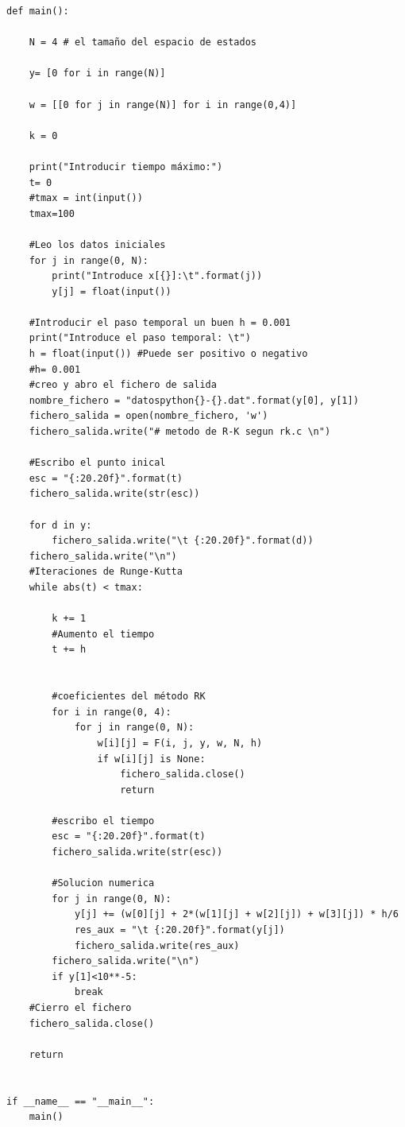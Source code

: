 \documentclass[pdftex,11pt,a4paper]{book}
\begin{document}
\begin{verbatim}
def main():

    N = 4 # el tamaño del espacio de estados

    y= [0 for i in range(N)]

    w = [[0 for j in range(N)] for i in range(0,4)]

    k = 0

    print("Introducir tiempo máximo:")
    t= 0
    #tmax = int(input())
    tmax=100

    #Leo los datos iniciales
    for j in range(0, N):
        print("Introduce x[{}]:\t".format(j))
        y[j] = float(input())

    #Introducir el paso temporal un buen h = 0.001
    print("Introduce el paso temporal: \t")
    h = float(input()) #Puede ser positivo o negativo
    #h= 0.001
    #creo y abro el fichero de salida
    nombre_fichero = "datospython{}-{}.dat".format(y[0], y[1])
    fichero_salida = open(nombre_fichero, 'w')
    fichero_salida.write("# metodo de R-K segun rk.c \n")

    #Escribo el punto inical
    esc = "{:20.20f}".format(t)
    fichero_salida.write(str(esc))

    for d in y:
        fichero_salida.write("\t {:20.20f}".format(d))
    fichero_salida.write("\n")
    #Iteraciones de Runge-Kutta
    while abs(t) < tmax:

        k += 1
        #Aumento el tiempo
        t += h


        #coeficientes del método RK
        for i in range(0, 4):
            for j in range(0, N):
                w[i][j] = F(i, j, y, w, N, h)
                if w[i][j] is None:
                    fichero_salida.close()
                    return

        #escribo el tiempo
        esc = "{:20.20f}".format(t)
        fichero_salida.write(str(esc))

        #Solucion numerica
        for j in range(0, N):
            y[j] += (w[0][j] + 2*(w[1][j] + w[2][j]) + w[3][j]) * h/6
            res_aux = "\t {:20.20f}".format(y[j])
            fichero_salida.write(res_aux)
        fichero_salida.write("\n")
        if y[1]<10**-5:
            break
    #Cierro el fichero
    fichero_salida.close()

    return


if __name__ == "__main__":
    main()
\end{verbatim}
\end{document}
